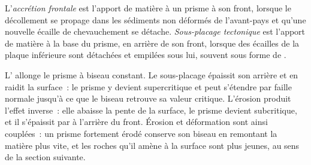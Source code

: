 \begin{definition}\label{def:b3:orogenic-wedges:accretion}
L'\emph{accrétion frontale} est l'apport de matière à un prisme
à son front, lorsque le décollement se propage dans les sédiments non déformés
de l'avant-pays et qu'une nouvelle écaille de chevauchement se détache. \emph{Sous-placage
tectonique} est l'apport de matière à la base du prisme,
en arrière de son front, lorsque des écailles de la plaque inférieure sont
détachées et empilées sous lui, souvent sous forme de .
\end{definition}

L' allonge le prisme à biseau constant. Le sous-placage épaissit
son arrière et en raidit la surface~: le prisme y devient supercritique et peut
s'étendre par faille normale jusqu'à ce que le biseau retrouve sa valeur critique.
L'érosion produit l'effet inverse~: elle abaisse la pente de la surface, le prisme devient
subcritique, et il s'épaissit par  à l'arrière du front.
Érosion et déformation sont ainsi couplées~: un prisme fortement érodé conserve
son biseau en remontant la matière plus vite, et les roches qu'il amène à la surface
sont plus jeunes, au sens de la section suivante.

